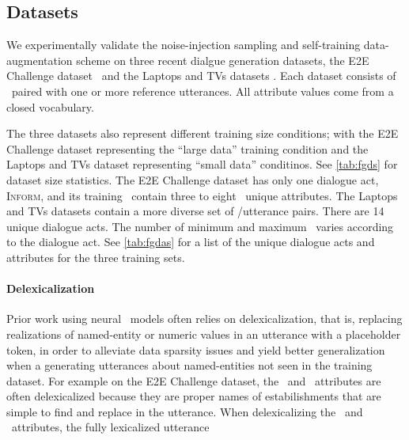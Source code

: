 \subsection{Datasets}



We experimentally validate the noise-injection sampling and self-training
data-augmentation scheme on three recent dialgue generation datasets,
the E2E Challenge dataset~\citep{novikova2017} 
and the Laptops and TVs datasets \citep{wen2016}.
%
%
Each dataset consists of \meaningrepresentations~paired with one or more 
reference utterances.
All attribute values 
come from a closed vocabulary.

The three datasets also represent different training size conditions; 
with the E2E Challenge dataset representing the ``large data'' training
condition and the Laptops and TVs dataset representing ``small data'' conditinos. See \autoref{tab:fgds} for dataset size statistics.
The E2E Challenge dataset has only one dialogue act, \textsc{Inform}, 
and its training \meaningrepresentations~contain three to eight
\attributes~unique attributes. 
The Laptops and TVs datasets contain a more diverse set of \meaningrepresentation/utterance pairs. There are 14 unique dialogue acts. 
The number of minimum and maximum \attributes~varies according to the dialogue
act. See \autoref{tab:fgdas} for a list of the unique dialogue acts
and attributes for the three training sets. 




\paragraph{Delexicalization}
Prior work using neural \naturallanguagegeneration~models often relies on 
delexicalization, that is, replacing realizations of named-entity or 
numeric values in an utterance with a placeholder token, in order to alleviate
data sparsity issues and yield better generalization when a generating utterances about named-entities not seen in the training dataset. For example
on the E2E Challenge dataset, the ~and ~attributes
are often delexicalized because they are proper names of estabilishments
that are simple to find and replace in the utterance.
When delexicalizing the ~and ~attributes,
the fully lexicalized utterance 

